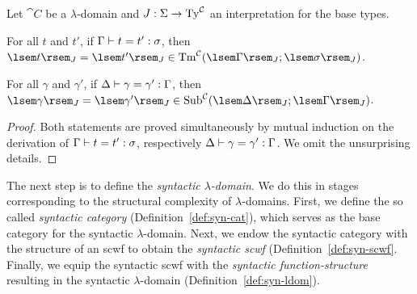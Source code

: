\begin{thm} \label{thm:cat-soundness}
Let $\cat{C}$ be a $\lambda$-domain and $J : \Basetypes \to \STy[\cat{C}]$ an interpretation for the base types.
\begin{enum}
\item For all $t$ and $t'$, if $\Gamma \vdash t = t' : \sigma$, then $\cint[J]{t} = \cint[J]{t'} \in \STm[\cint[J]{\Gamma}]{\cint[J]{\sigma}}[\cat{C}]$.
\item For all $\gamma$ and $\gamma'$, if $\Delta \vdash \gamma = \gamma' : \Gamma$, then $\cint[J]{\gamma} = \cint[J]{\gamma'} \in \SSub{\cint[J]{\Delta}}{\cint[J]{\Gamma}}[\cat{C}]$.
\end{enum}
\begin{proof}
Both statements are proved simultaneously by mutual induction on the derivation of $\Gamma \vdash t = t' : \sigma$, respectively $\Delta \vdash \gamma = \gamma' : \Gamma$.
We omit the unsurprising details.
\end{proof}
\end{thm}

The next step is to define the \textit{syntactic $\lambda$-domain}. We do this in stages corresponding to the structural complexity of $\lambda$-domains. First, we define the so called \textit{syntactic category} (Definition~\ref{def:syn-cat}), which serves as the base category for the syntactic $\lambda$-domain. Next, we endow the syntactic category with the structure of an scwf to obtain the \textit{syntactic scwf} (Definition~\ref{def:syn-scwf}. Finally, we equip the syntactic scwf with the \textit{syntactic function-structure} resulting in the syntactic $\lambda$-domain (Definition~\ref{def:syn-ldom}).

